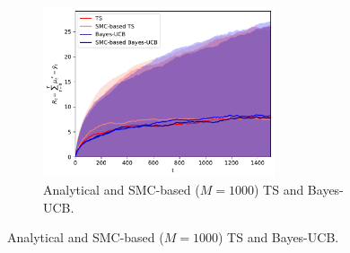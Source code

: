 \begin{figure}[!h]
	\centering
	\begin{subfigure}[b]{\textwidth}
		\centering
		\includegraphics[width=0.75\textwidth]{./fods_figs/static/bernoulli/A2/theta0.1_0.3_M1000_cumulative_regret}
		\caption{Analytical and SMC-based ($M=1000$) TS and Bayes-UCB.}
	\end{subfigure}
	

\end{figure}
